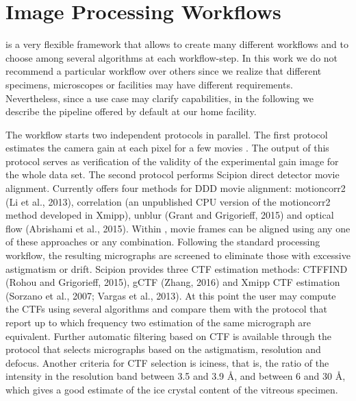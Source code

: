 
\section{Image Processing Workflows}

\scipion is a very flexible framework that allows to create many different workflows and to choose among several algorithms at each workflow-step. In this work we do not recommend a particular workflow  over others since we realize that different specimens, microscopes or facilities may have different requirements. Nevertheless, since a use case may clarify \scipion capabilities, in the following we describe the pipeline offered by default 
at our home facility.

The workflow starts two independent protocols in parallel. The first protocol estimates the camera gain at each pixel for a few  movies \citep{sorzano2018}. %
The output of this protocol serves as verification of the validity of the experimental gain image for the whole data set. The second protocol performs Scipion direct detector movie alignment. Currently \scipion offers  four  methods  for  DDD  movie  alignment: motioncorr2 (Li et al., 2013), correlation (an unpublished CPU version of the motioncorr2 method developed in Xmipp), unblur (Grant and Grigorieff, 2015) and optical flow (Abrishami et al., 2015). Within \scipion, movie frames can be aligned using any one of these approaches or any combination. Following the standard processing workflow, the resulting micrographs are screened to eliminate those with excessive astigmatism or drift. Scipion provides three CTF estimation methods:
CTFFIND (Rohou and Grigorieff, 2015), gCTF (Zhang, 2016) and Xmipp CTF estimation (Sorzano et al., 2007; Vargas et al., 2013). At this point the user may compute the CTFs using several algorithms and compare them with the protocol  that report up to which frequency two estimation of the same micrograph are equivalent. Further automatic filtering based on CTF is available through the protocol  that selects micrographs based on the astigmatism, resolution and defocus. Another criteria for CTF selection is iciness, that is,  the ratio of the intensity in the resolution band between 3.5 and 3.9 \AA, and between 6 and 30 \AA, which gives a good estimate of the ice crystal content of the vitreous specimen.

